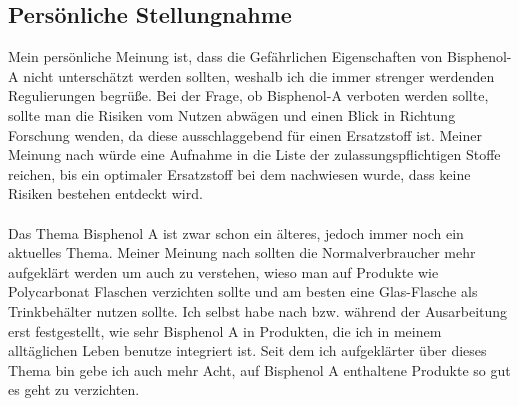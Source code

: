 \subsection{Persönliche Stellungnahme}
Mein persönliche Meinung ist, dass die Gefährlichen Eigenschaften von Bisphenol-A nicht unterschätzt werden sollten, weshalb ich die immer strenger werdenden Regulierungen begrüße. Bei der Frage, ob Bisphenol-A verboten werden sollte, sollte man die Risiken vom Nutzen abwägen und einen Blick in Richtung Forschung wenden, da diese ausschlaggebend für einen Ersatzstoff ist. Meiner Meinung nach würde eine Aufnahme in die Liste der zulassungspflichtigen Stoffe reichen, bis ein optimaler Ersatzstoff bei dem nachwiesen wurde, dass keine Risiken bestehen entdeckt wird.\\
\\
Das Thema Bisphenol A ist zwar schon ein älteres, jedoch immer noch ein aktuelles Thema.
Meiner Meinung nach sollten die Normalverbraucher mehr aufgeklärt werden um auch zu verstehen, wieso man auf Produkte wie Polycarbonat Flaschen verzichten sollte und am besten eine Glas-Flasche als Trinkbehälter nutzen sollte. Ich selbst habe nach bzw. während der Ausarbeitung erst festgestellt, wie sehr Bisphenol A in Produkten, die ich in meinem alltäglichen Leben benutze integriert ist. Seit dem ich aufgeklärter über dieses Thema bin gebe ich auch mehr Acht, auf Bisphenol A enthaltene Produkte so gut es geht zu verzichten.
